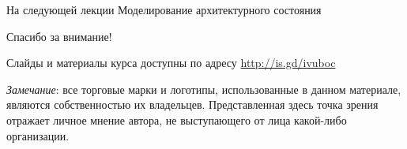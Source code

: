 \documentclass{beamer}
\begin{document}
\begin{frame}{На следующей лекции}
Моделирование архитектурного состояния
\end{frame}


\begin{frame}

{\huge{Спасибо за внимание!}\par}

\vfill

Слайды и материалы курса доступны по адресу \url{http://is.gd/ivuboc} %

\vfill

\tiny{\textit{Замечание}: все торговые марки и логотипы, использованные в данном материале, являются собственностью их владельцев. Представленная здесь точка зрения отражает личное мнение автора, не выступающего от лица какой-либо организации.}

\end{frame}
\end{document}
